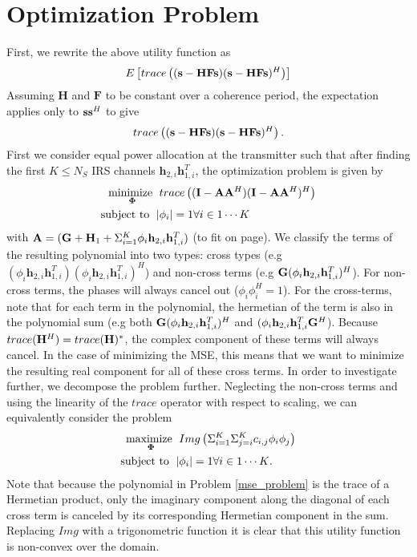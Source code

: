 \documentclass[12pt,a4paper]{report}
\begin{document}
\section{Optimization Problem}
First, we rewrite the above utility function as
	\begin{equation}
E\left[ trace\left((\mathbf{s} - \mathbf{H}\mathbf{F}\mathbf{s})(\mathbf{s} - \mathbf{H}\mathbf{F}\mathbf{s})^H \right)\right]
\end{equation}
Assuming $\mathbf{H}$ and $\mathbf{F}$ to be constant over a coherence period, the expectation applies only to $\mathbf{s} \mathbf{s}^H$ to give
	\begin{equation}
trace\left((\mathbf{s} - \mathbf{H}\mathbf{F}\mathbf{s})(\mathbf{s} - \mathbf{H}\mathbf{F}\mathbf{s})^H \right).
\end{equation}
First we consider equal power allocation at the transmitter such that after finding the first $K \leq N_S$ IRS channels $\mathbf{h}_{2,i}\mathbf{h}^T_{1,i}$, the optimization problem
is given by
	\begin{align}
	    \underset{\boldsymbol{\Phi}}{\text{minimize }}
	    & \; trace\left((\mathbf{I} - \mathbf{A}\mathbf{A}^H)
	   (\mathbf{I} - \mathbf{A}\mathbf{A}^H)^H \right)
	     \\
	    \text{subject to  } \; &
	    | \phi_i | = 1  \forall i \in {1 \cdots	 K}
	\end{align}\label{mse_problem}
	with $\mathbf{A} = (\mathbf{G} +  \mathbf{H}_1 + \Sigma_{i=1}^{K} \phi_i \mathbf{h}_{2,i}\mathbf{h}^T_{1,i})$ (to fit on page).
	We classify the terms of the resulting polynomial into two types:
	cross types (e.g $(\phi_i \mathbf{h}_{2,i}\mathbf{h}^T_{1,i})(\phi_i \mathbf{h}_{2,i}\mathbf{h}^T_{1,i})^H$) and non-cross terms (e.g $\mathbf{G} (\phi_i \mathbf{h}_{2,i}\mathbf{h}^T_{1,i})^H$). For non-cross terms, the phases will always cancel out ($\phi_i \phi_i^H = 1$). For the cross-terms, note that
	for each term in the polynomial, the hermetian of the term is also in the polynomial sum (e.g both $\mathbf{G} (\phi_i \mathbf{h}_{2,i}\mathbf{h}^T_{1,i})^H$ and $ (\phi_i \mathbf{h}_{2,i}\mathbf{h}^T_{1,i}\mathbf{G}^H$). Because $trace(\mathbf{H}^H) = trace(\mathbf{H})^*$, the complex component of these terms will always cancel. In the case of minimizing the MSE, this means that we want to minimize the resulting real component for all of these cross terms. In order to investigate further, we decompose the problem further. Neglecting the non-cross terms and using the linearity of the $trace$ operator with respect to scaling, we can equivalently consider the problem 
	\begin{align}
	    \underset{\boldsymbol{\Phi}}{\text{maximize }}
	    & \; Img \left( \Sigma_{i=1}^{K} \Sigma_{j=i}^{K} c_{i,j} \phi_{i} \phi_{j}  \right)
	     \\
	    \text{subject to  } \; &
	    | \phi_i | = 1  \forall i \in {1 \cdots	 K}.
	\end{align}\label{mse_problem_clear}
	Note that because the polynomial in Problem \eqref{mse_problem} is the trace of a Hermetian product, only the imaginary component along the diagonal of each cross term is canceled by its corresponding Hermetian component in the sum. Replacing $ Img$ with a trigonometric function it is clear that this utility function is non-convex over the domain.
\end{document}

